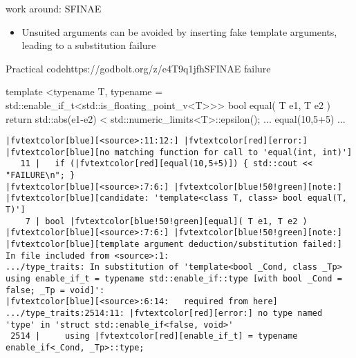 \begin{frame}[fragile]
  \begin{block}{ work around: SFINAE}
    \begin{itemize}
    \item Unsuited arguments can be avoided by inserting fake template arguments,
    leading to a substitution failure
    \end{itemize}
  \end{block}
  \begin{exampleblockGB}{Practical code}{https://godbolt.org/z/e4T9q1jfh}{SFINAE failure}
    \scriptsize
    \begin{cppcode*}{}
    template
    <typename T,
     typename = std::enable_if_t<std::is_floating_point_v<T>>>
    bool equal( T e1, T e2 ) {
      return std::abs(e1-e2) < std::numeric_limits<T>::epsilon();
    }
    ... equal(10,5+5) ...
    \end{cppcode*}
    \pause
    \tiny
    \begin{Verbatim}[commandchars=\|\[\]]
|fvtextcolor[blue][<source>:11:12:] |fvtextcolor[red][error:] |fvtextcolor[blue][no matching function for call to 'equal(int, int)']
   11 |   if (|fvtextcolor[red][equal(10,5+5)]) { std::cout << "FAILURE\n"; }
|fvtextcolor[blue][<source>:7:6:] |fvtextcolor[blue!50!green][note:] |fvtextcolor[blue][candidate: 'template<class T, class> bool equal(T, T)']
    7 | bool |fvtextcolor[blue!50!green][equal]( T e1, T e2 )
|fvtextcolor[blue][<source>:7:6:] |fvtextcolor[blue!50!green][note:]   |fvtextcolor[blue][template argument deduction/substitution failed:]
In file included from <source>:1:
.../type_traits: In substitution of 'template<bool _Cond, class _Tp>
using enable_if_t = typename std::enable_if::type [with bool _Cond = false; _Tp = void]':
|fvtextcolor[blue][<source>:6:14:   required from here]
.../type_traits:2514:11: |fvtextcolor[red][error:] no type named 'type' in 'struct std::enable_if<false, void>'
 2514 |     using |fvtextcolor[red][enable_if_t] = typename enable_if<_Cond, _Tp>::type;
    \end{Verbatim}
  \end{exampleblockGB}
\end{frame}


